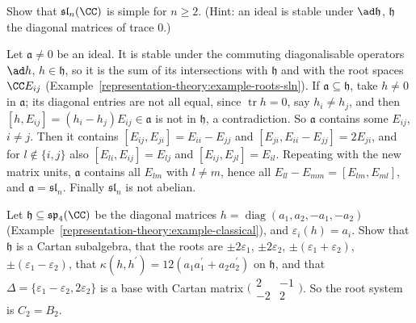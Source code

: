\begin{exercise}\label{representation-theory:exercise-sln-simple}
Show that $\mathfrak{sl}_n(\CC)$ is simple for $n \geq 2$. (Hint: an ideal is stable under $\ad\mathfrak{h}$, $\mathfrak{h}$ the diagonal matrices of trace $0$.)
\end{exercise}

\begin{solution}
Let $\mathfrak{a} \neq 0$ be an ideal. It is stable under the commuting diagonalisable operators $\ad h$, $h \in \mathfrak{h}$, so it is the sum of its intersections with $\mathfrak{h}$ and
with the root spaces $\CC E_{ij}$ (Example~\ref{representation-theory:example-roots-sln}). If $\mathfrak{a} \subseteq \mathfrak{h}$, take $h \neq 0$ in $\mathfrak{a}$; its diagonal entries are
not all equal, since $\operatorname{tr}h = 0$, say $h_i \neq h_j$, and then $[h, E_{ij}] = (h_i - h_j)E_{ij} \in \mathfrak{a}$ is not in $\mathfrak{h}$, a contradiction. So $\mathfrak{a}$
contains some $E_{ij}$, $i \neq j$. Then it contains $[E_{ij}, E_{ji}] = E_{ii} - E_{jj}$ and $[E_{ji}, E_{ii} - E_{jj}] = 2E_{ji}$, and for $l \notin \{i, j\}$ also $[E_{li}, E_{ij}] = E_{lj}$
and $[E_{ij}, E_{jl}] = E_{il}$. Repeating with the new matrix units, $\mathfrak{a}$ contains all $E_{lm}$ with $l \neq m$, hence all $E_{ll} - E_{mm} = [E_{lm}, E_{ml}]$, and
$\mathfrak{a} = \mathfrak{sl}_n$. Finally $\mathfrak{sl}_n$ is not abelian.
\end{solution}

\begin{exercise}\label{representation-theory:exercise-sp4-roots}
Let $\mathfrak{h} \subseteq \mathfrak{sp}_4(\CC)$ be the diagonal matrices $h = \operatorname{diag}(a_1, a_2, -a_1, -a_2)$ (Example~\ref{representation-theory:example-classical}), and
$\varepsilon_i(h) = a_i$. Show that $\mathfrak{h}$ is a Cartan subalgebra, that the roots are $\pm2\varepsilon_1$, $\pm2\varepsilon_2$, $\pm(\varepsilon_1 + \varepsilon_2)$,
$\pm(\varepsilon_1 - \varepsilon_2)$, that $\kappa(h, h^{\prime}) = 12(a_1a_1^{\prime} + a_2a_2^{\prime})$ on $\mathfrak{h}$, and that $\Delta = \{\varepsilon_1 - \varepsilon_2, 2\varepsilon_2\}$ is a base
with Cartan matrix $\bigl(\begin{smallmatrix}2 & -1\\ -2 & 2\end{smallmatrix}\bigr)$. So the root system is $C_2 = B_2$.
\end{exercise}

